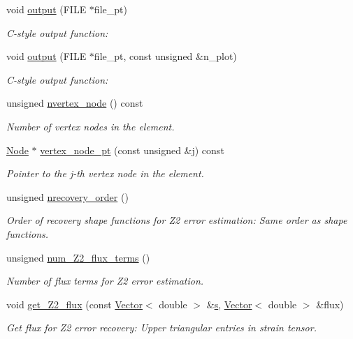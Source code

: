 \begin{DoxyCompactItemize}
void \hyperlink{classoomph_1_1TPMLTimeHarmonicLinearElasticityElement_ad6b5c28537ce21dd900d030da1df54ec}{output} (F\+I\+LE $\ast$file\+\_\+pt)
\begin{DoxyCompactList}\small\item\em C-\/style output function\+: \end{DoxyCompactList}\item 
void \hyperlink{classoomph_1_1TPMLTimeHarmonicLinearElasticityElement_a5edb532350fa452e91da31a872f21eac}{output} (F\+I\+LE $\ast$file\+\_\+pt, const unsigned \&n\+\_\+plot)
\begin{DoxyCompactList}\small\item\em C-\/style output function\+: \end{DoxyCompactList}\item 
unsigned \hyperlink{classoomph_1_1TPMLTimeHarmonicLinearElasticityElement_ac58c850dc51484b11de1b2ae07c3f1ea}{nvertex\+\_\+node} () const
\begin{DoxyCompactList}\small\item\em Number of vertex nodes in the element. \end{DoxyCompactList}\item 
\hyperlink{classoomph_1_1Node}{Node} $\ast$ \hyperlink{classoomph_1_1TPMLTimeHarmonicLinearElasticityElement_add9c0029672f916ceb55c0047bccbc68}{vertex\+\_\+node\+\_\+pt} (const unsigned \&j) const
\begin{DoxyCompactList}\small\item\em Pointer to the j-\/th vertex node in the element. \end{DoxyCompactList}\item 
unsigned \hyperlink{classoomph_1_1TPMLTimeHarmonicLinearElasticityElement_ae7ac13cf22682d07ed3e3b7bce2ed05b}{nrecovery\+\_\+order} ()
\begin{DoxyCompactList}\small\item\em Order of recovery shape functions for Z2 error estimation\+: Same order as shape functions. \end{DoxyCompactList}\item 
unsigned \hyperlink{classoomph_1_1TPMLTimeHarmonicLinearElasticityElement_ac7cb9f7b5a5194e5f27df25fa2c6fb50}{num\+\_\+\+Z2\+\_\+flux\+\_\+terms} ()
\begin{DoxyCompactList}\small\item\em Number of \textquotesingle{}flux\textquotesingle{} terms for Z2 error estimation. \end{DoxyCompactList}\item 
void \hyperlink{classoomph_1_1TPMLTimeHarmonicLinearElasticityElement_a296d3643e117f2d2e0bc29b513922735}{get\+\_\+\+Z2\+\_\+flux} (const \hyperlink{classoomph_1_1Vector}{Vector}$<$ double $>$ \&\hyperlink{cfortran_8h_ab7123126e4885ef647dd9c6e3807a21c}{s}, \hyperlink{classoomph_1_1Vector}{Vector}$<$ double $>$ \&flux)
\begin{DoxyCompactList}\small\item\em Get \textquotesingle{}flux\textquotesingle{} for Z2 error recovery\+: Upper triangular entries in strain tensor. \end{DoxyCompactList}\end{DoxyCompactItemize}
